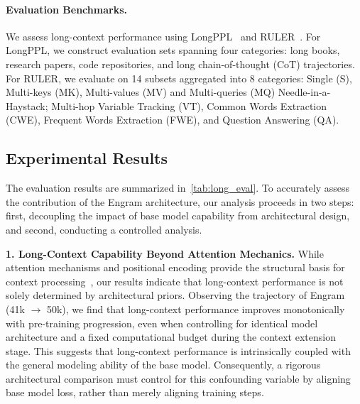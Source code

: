 \paragraph{Evaluation Benchmarks.} We assess long-context performance using LongPPL~\citep{fangwrong} and RULER~\citep{hsiehruler}. For LongPPL, we construct evaluation sets spanning four categories: long books, research papers, code repositories, and long chain-of-thought (CoT) trajectories. For RULER, we evaluate on 14 subsets aggregated into 8 categories: Single (S), Multi-keys (MK), Multi-values (MV) and Multi-queries (MQ) Needle-in-a-Haystack; Multi-hop Variable Tracking (VT), Common Words Extraction (CWE), Frequent Words Extraction (FWE), and Question Answering (QA).

\subsection{Experimental Results}

The evaluation results are summarized in~\autoref{tab:long_eval}. To accurately assess the contribution of the Engram architecture, our analysis proceeds in two steps: first, decoupling the impact of base model capability from architectural design, and second, conducting a controlled analysis.

\textbf{1. Long-Context Capability Beyond Attention Mechanics.} 
While attention mechanisms and positional encoding provide the structural basis for context processing~\citep{su2023roformerenhancedtransformerrotary,press2021train,yang2025path,xiao2023efficient}, our results indicate that long-context performance is not solely determined by architectural priors. Observing the trajectory of Engram (41k $\rightarrow$ 50k), we find that long-context performance improves monotonically with pre-training progression, even when controlling for identical model architecture and a fixed computational budget during the context extension stage.
This suggests that long-context performance is intrinsically coupled with the general modeling ability of the base model. Consequently, a rigorous architectural comparison must control for this confounding variable by aligning base model loss, rather than merely aligning training steps.

